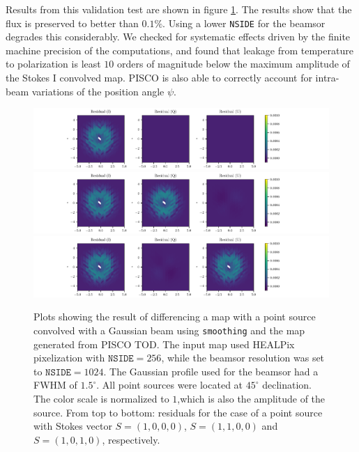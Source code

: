 \documentclass[a4paper,11pt]{article}
\begin{document}
Results from this validation test are shown in figure \ref{fig::stokesqsource256beam1024dec45}. The results show that the flux is preserved to better than $0.1\%$. Using a lower \texttt{NSIDE} for the beamsor degrades this considerably. We checked for systematic effects driven by the finite machine precision of the computations, and found that leakage from temperature to polarization is least $10$ orders of magnitude below the maximum amplitude of the Stokes I convolved map. PISCO is also able to correctly account for intra-beam variations of the position angle $\psi$.

\begin{figure}
	\centering
	\includegraphics[width=1.0\linewidth]{figures/stokes_I_source_256_beam_1024_dec_45.pdf}
	\includegraphics[width=1.0\linewidth]{figures/stokes_Q_source_256_beam_1024_dec_45.pdf}
	\includegraphics[width=1.0\linewidth]{figures/stokes_U_source_256_beam_1024_dec_45.pdf}
	\caption{Plots showing the result of differencing a map with a point source convolved with a Gaussian beam using \texttt{smoothing} and the map generated from PISCO TOD. The input map used HEALPix pixelization with $\mathrm{\texttt{NSIDE}} = 256$, while the beamsor resolution was set to $\mathrm{\texttt{NSIDE}} = 1024$. The Gaussian profile used for the beamsor had a FWHM of $1.5^\circ$. All point sources were located at $45^\circ$ declination. The color scale is normalized to $1$,which is also the amplitude of the source. From top to bottom: residuals for the case of a point source with Stokes vector $S = (1,0,0,0)$, $S=(1,1,0,0)$ and $S=(1,0,1,0)$, respectively.}
	\label{fig::stokesqsource256beam1024dec45}
\end{figure}
\end{document}
